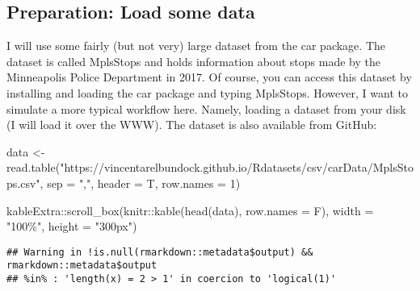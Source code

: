 \documentclass[
]{article}
\newenvironment{Shaded}{\begin{snugshade}}{\end{snugshade}}
\newcommand{\AttributeTok}[1]{\textcolor[rgb]{0.77,0.63,0.00}{#1}}
\newcommand{\DecValTok}[1]{\textcolor[rgb]{0.00,0.00,0.81}{#1}}
\newcommand{\FunctionTok}[1]{\textcolor[rgb]{0.00,0.00,0.00}{#1}}
\newcommand{\NormalTok}[1]{#1}
\newcommand{\OtherTok}[1]{\textcolor[rgb]{0.56,0.35,0.01}{#1}}
\newcommand{\SpecialCharTok}[1]{\textcolor[rgb]{0.00,0.00,0.00}{#1}}
\newcommand{\StringTok}[1]{\textcolor[rgb]{0.31,0.60,0.02}{#1}}
\begin{document}
\hypertarget{preparation-load-some-data}{%
\subsection{Preparation: Load some
data}\label{preparation-load-some-data}}

I will use some fairly (but not very) large dataset from the car
package. The dataset is called MplsStops and holds information about
stops made by the Minneapolis Police Department in 2017. Of course, you
can access this dataset by installing and loading the car package and
typing MplsStops. However, I want to simulate a more typical workflow
here. Namely, loading a dataset from your disk (I will load it over the
WWW). The dataset is also available from GitHub:

\begin{Shaded}
\begin{Highlighting}[]
\NormalTok{data }\OtherTok{\textless{}{-}} \FunctionTok{read.table}\NormalTok{(}\StringTok{"https://vincentarelbundock.github.io/Rdatasets/csv/carData/MplsStops.csv"}\NormalTok{,}
                   \AttributeTok{sep =} \StringTok{","}\NormalTok{, }\AttributeTok{header =}\NormalTok{ T,}
                   \AttributeTok{row.names =} \DecValTok{1}\NormalTok{)}

\NormalTok{kableExtra}\SpecialCharTok{::}\FunctionTok{scroll\_box}\NormalTok{(knitr}\SpecialCharTok{::}\FunctionTok{kable}\NormalTok{(}\FunctionTok{head}\NormalTok{(data), }\AttributeTok{row.names =}\NormalTok{ F),}
           \AttributeTok{width =} \StringTok{"100\%"}\NormalTok{, }\AttributeTok{height =} \StringTok{"300px"}\NormalTok{)}
\end{Highlighting}
\end{Shaded}

\begin{verbatim}
## Warning in !is.null(rmarkdown::metadata$output) && rmarkdown::metadata$output
## %in% : 'length(x) = 2 > 1' in coercion to 'logical(1)'
\end{verbatim}
\end{document}
